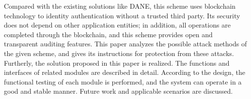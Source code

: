 \begin{eabstract}
Compared with the existing solutions like DANE, this scheme uses blockchain technology to identity authentication without a trusted third party. Its security does not depend on other application entities; in addition, all operations are completed through the blockchain, and this scheme provides open and transparent auditing features. This paper analyzes the possible attack methods of the given scheme, and gives its instructions for protection from these attacks. Furtherly, the solution proposed in this paper is realized. The functions and interfaces of related modules are described in detail. According to the design, the functional testing of each module is performed, and the system can operate in a good and stable manner. Future work and applicable scenarios are discussed.

\end{eabstract}

